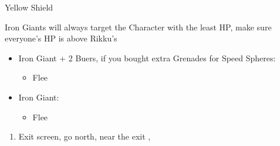 \begin{equip}
\begin{itemize}
\tidusf Yellow Shield
\end{itemize}
\end{equip}
\begin{encounters}
    Iron Giants will always target the Character with the least HP, make sure everyone's HP is above Rikku's
    \begin{itemize}
        \item Iron Giant + 2 Buers, if you bought extra Grenades for Speed Spheres:
        \begin{itemize}
            \switch{\tidus}{\rikku}
            \rikkuf Use Grenade
            \wakkaf Defend
            \auronf Defend
            \enemyf Attacks \rikku
            \switch{\wakka}{\tidus}
            \item Flee
        \end{itemize}
        \item Iron Giant:
        \begin{itemize}
            \tidusf Defend
            \switch{\wakka}{\rikku}
            \rikkuf Steal Light Curtain
            \auronf Defend
            \enemyf Attacks \rikku
            \item Flee
        \end{itemize}
    \end{itemize}
\end{encounters}
\begin{enumerate}[resume]
    \item Exit screen, go north, near the exit \sd, \cs[3:10]
\end{enumerate}